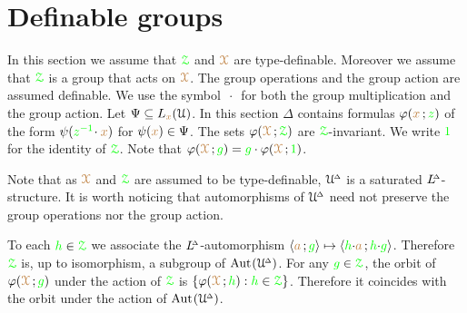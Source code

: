 \section{Definable groups}\label{definablegroups}

\def\medrel#1{\parbox[t]{5ex}{$\displaystyle\hfil #1$}}
\def\ceq#1#2#3{\parbox[t]{25ex}{$\displaystyle #1$}\medrel{#2}{$\displaystyle #3$}}

In this section we assume that $\grZ$ and $\mrX$ are type-definable.
Moreover we assume that $\grZ$ is a group that acts on $\mrX$.
The group operations and the group action are assumed definable.
We use the symbol $\,\cdot\,$ for both the group multiplication and the group action.
Let $\Psi\subseteq L_{\mr x}(\U)$.
In this section $\Delta$ contains formulas $\phi({\mr x}\,;{\gr z})$ of the form  $\psi({\gr z^{-1}}\!\cdot{\mr x})$ for $\psi({\mr x})\in\Psi$.
The sets $\phi(\mrX\,;\grZ)$ are $\grZ$-invariant.
We write ${\gr 1}$ for the identity of $\grZ$.
Note that $\phi(\mrX\,;{\gr g})={\gr g}\cdot\phi(\mrX\,;{\gr 1})$.

Note that as $\mrX$ and $\grZ$ are assumed to be type-definable, $\UDelta$ is a saturated $\LDelta$-structure.
It is worth noticing that automorphisms of $\UDelta$ need not preserve the group operations nor the group action.

To each ${\gr h}\in\grZ$ we associate the $\LDelta$-automorphism $\<{\mr a}\,;{\gr g}\>\mapsto\<{\gr h}{\cdot}{\mr a}\,;{\gr h}{\cdot}{\gr g}\>$.
Therefore $\grZ$ is, up to isomorphism, a subgroup of $\Aut(\UDelta)$.
For any ${\gr g}\in\grZ$, the orbit of $\phi(\mrX\,;{\gr g})$ under the action of $\grZ$ is $\{\phi(\mrX\,;{\gr h}) : {\gr h}\in\grZ\}$.
Therefore it coincides with the orbit under the action of $\Aut(\UDelta)$.




